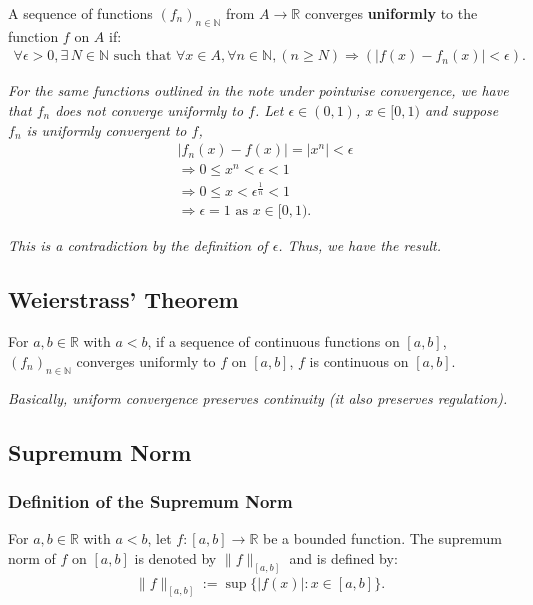 \documentclass[a4paper, 12pt, twoside]{article}
\begin{document}
A sequence of functions $(f_n)_{n \in \mathbb{N}}$ from
$A \to \mathbb{R}$ converges \textbf{uniformly} to the
function $f$ on $A$ if:
\begin{align*}
      \forall \epsilon > 0, \exists\,N \in \mathbb{N} \text{ such that }
      \forall x \in A, \forall n \in \mathbb{N},
      (n \geq N) \Rightarrow (|f(x) - f_n(x)| < \epsilon).
\end{align*}

\textit{For the same functions outlined in the note under pointwise
convergence, we have that $f_n$ does not converge uniformly to $f$.
Let $\epsilon \in (0, 1)$, $x \in [0, 1)$ and suppose $f_n$ is
uniformly convergent to $f$,}
\begin{align*}
       & |f_n(x)-f(x)| = |x^n| < \epsilon                   \\
       & \Rightarrow 0 \leq x^n < \epsilon < 1              \\
       & \Rightarrow 0 \leq x < \epsilon^{\frac{1}{n}} < 1  \\
       & \Rightarrow \epsilon = 1 \text{ as } x \in [0, 1).
\end{align*}

\textit{This is a contradiction by the definition of $\epsilon$.
      Thus, we have the result.}

\subsection{Weierstrass' Theorem}

For $a, b \in \mathbb{R}$ with $a < b$, if a sequence of continuous
functions on $[a, b]$, $(f_n)_{n \in \mathbb{N}}$ converges
uniformly to $f$ on $[a, b]$, $f$ is continuous on $[a, b]$.

\vspace{\baselineskip}

\textit{Basically, uniform convergence preserves continuity (it also
      preserves regulation).}

\subsection{Supremum Norm}

\subsubsection{Definition of the Supremum Norm}

For $a, b \in \mathbb{R}$ with $a < b$, let $f:[a, b]\to\mathbb{R}$
be a bounded function. The supremum norm of $f$ on $[a,b]$ is
denoted by $\|f\|_{[a,b]}$ and is defined by:
\begin{align*}
      \|f\|_{[a,b]} := \sup{\{|f(x)| : x \in [a,b]\}}.
\end{align*}
\end{document}
